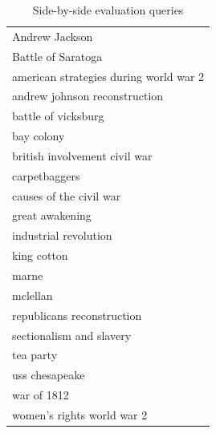 \documentclass[pdfpagelabels=false,plainpages=true]{acm_proc_article-sp}
\begin{document}
\begin{table}
\begin{center}
\begin{tabular}{|l|} \hline
Andrew Jackson \\
Battle of Saratoga \\
american strategies during world war 2 \\
andrew johnson reconstruction \\
battle of vicksburg \\
bay colony \\
british involvement civil war \\
carpetbaggers \\
causes of the civil war \\
great awakening \\
industrial revolution \\
king cotton \\
marne \\
mclellan \\
republicans reconstruction \\
sectionalism and slavery \\
tea party \\
uss chesapeake \\
war of 1812 \\
women's rights world war 2 \\
\hline\end{tabular}
\caption{Side-by-side evaluation queries}
\label{tab-queries}
\end{center}
\end{table}
\end{document}
